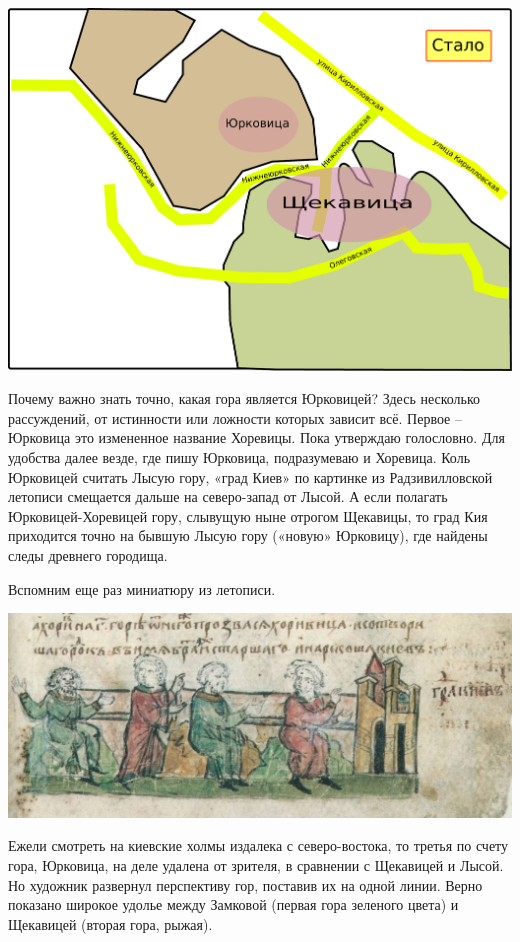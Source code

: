 \begin{center}
\includegraphics[width=0.90\linewidth]{chast-kirvys/poisk-yourk/yourk-stalo.pdf}
\end{center} 

Почему важно знать точно, какая гора является Юрковицей? Здесь несколько рассуждений, от истинности или ложности которых зависит всё. Первое – Юрковица это измененное название Хоревицы. Пока утверждаю голословно. Для удобства далее везде, где пишу Юрковица, подразумеваю и Хоревица. Коль Юрковицей считать Лысую гору, «град Киев» по картинке из Радзивилловской летописи смещается дальше на северо-запад от Лысой. А если полагать Юрковицей-Хоревицей гору, слывущую ныне отрогом Щекавицы, то град Кия приходится точно на бывшую Лысую гору («новую» Юрковицу), где найдены следы древнего городища.

Вспомним еще раз миниатюру из летописи.

\begin{center}
\includegraphics[width=\linewidth]{chast-kirvys/poisk-yourk/radz-tri-brata.jpg}
\end{center} 

Ежели смотреть на киевские холмы издалека с северо-востока, то третья по счету гора, Юрковица, на деле удалена от зрителя, в сравнении с Щекавицей и Лысой. Но художник развернул перспективу гор, поставив их на одной линии. Верно показано широкое удолье между Замковой (первая гора зеленого цвета) и Щекавицей (вторая гора, рыжая). 

